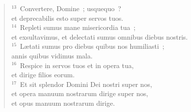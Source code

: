 \begin{flushleft}
\begin{verse}
${}^{13}$~Convertere, Domine~; usquequo~?\\ et deprecabilis esto super servos tuos.\\
${}^{14}$~Repleti sumus mane misericordia tua~;\\ et exsultavimus, et delectati sumus omnibus diebus nostris.\\
${}^{15}$~L\ae tati sumus pro diebus quibus nos humiliasti~;\\ annis quibus vidimus mala.\\
${}^{16}$~Respice in servos tuos et in opera tua,\\ et dirige filios eorum.\\
${}^{17}$~Et sit splendor Domini Dei nostri super nos,\\ et opera manuum nostrarum dirige super nos,\\ et opus manuum nostrarum dirige.\end{verse}\end{flushleft}


